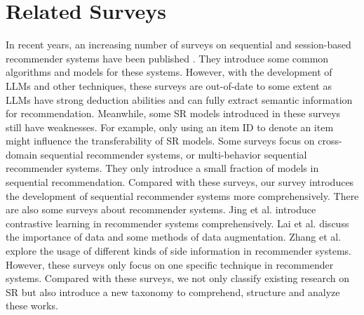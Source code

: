 \documentclass[review]{fcs}
\begin{document}
	\section{Related Surveys}\label{sec:related_surveys}
	In recent years, an increasing number of surveys on sequential and session-based recommender systems have been published \cite{Wang.al., li.al., quadrana.al., nasir.al., fang.al., Boka.al.}. They introduce some common algorithms and models for these systems. However, with the development of LLMs and other techniques, these surveys are out-of-date to some extent as LLMs have strong deduction abilities and can fully extract semantic information for recommendation. Meanwhile, some SR models introduced in these surveys still have weaknesses. For example, only using an item ID to denote an item might influence the transferability of SR models. Some surveys \cite{chen.al., chen_shu.al.} focus on cross-domain sequential recommender systems, or multi-behavior sequential recommender systems. They only introduce a small fraction of models in sequential recommendation. Compared with these surveys, our survey introduces the development of sequential recommender systems more comprehensively. There are also some surveys about recommender systems. Jing et al. \cite{jing.al.} introduce contrastive learning in recommender systems comprehensively. Lai et al. \cite{lai.al.} discuss the importance of data and some methods of data augmentation. Zhang et al. \cite{zhang.al.1} explore the usage of different kinds of side information in recommender systems. However, these surveys only focus on one specific technique in recommender systems. Compared with these surveys, we not only classify existing research on SR but also introduce a new taxonomy to comprehend,  structure and analyze these works.
\end{document}
